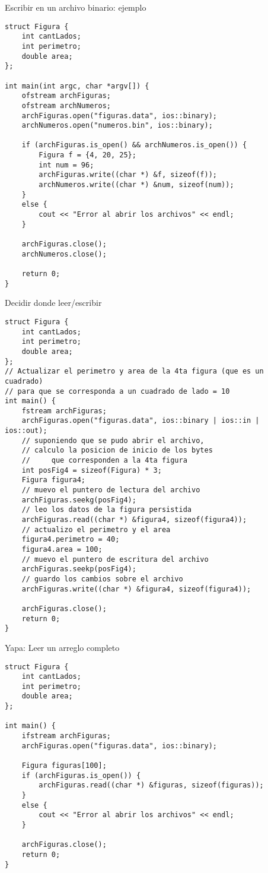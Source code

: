 \documentclass[12pt]{beamer}
\begin{document}
\begin{frame}[fragile]{Escribir en un archivo binario: ejemplo}
\begin{lstlisting}[basicstyle=\tiny]
struct Figura {
	int cantLados;
	int perimetro;
	double area;
};

int main(int argc, char *argv[]) {
	ofstream archFiguras;
	ofstream archNumeros;
	archFiguras.open("figuras.data", ios::binary);
	archNumeros.open("numeros.bin", ios::binary);
	
	if (archFiguras.is_open() && archNumeros.is_open()) {
		Figura f = {4, 20, 25};
		int num = 96;
		archFiguras.write((char *) &f, sizeof(f));
		archNumeros.write((char *) &num, sizeof(num));
	}
	else {
		cout << "Error al abrir los archivos" << endl;
	}
	
	archFiguras.close();
	archNumeros.close();
	
	return 0;
}
\end{lstlisting}
\end{frame}

\begin{frame}[fragile]{Decidir donde leer/escribir}
\begin{lstlisting}[basicstyle=\tiny]
struct Figura {
    int cantLados;
    int perimetro;
    double area;
};
// Actualizar el perimetro y area de la 4ta figura (que es un cuadrado)
// para que se corresponda a un cuadrado de lado = 10
int main() {
    fstream archFiguras;
    archFiguras.open("figuras.data", ios::binary | ios::in | ios::out);
    // suponiendo que se pudo abrir el archivo,
    // calculo la posicion de inicio de los bytes
    //     que corresponden a la 4ta figura
    int posFig4 = sizeof(Figura) * 3;
    Figura figura4;
    // muevo el puntero de lectura del archivo
    archFiguras.seekg(posFig4);
    // leo los datos de la figura persistida
    archFiguras.read((char *) &figura4, sizeof(figura4));
    // actualizo el perimetro y el area
    figura4.perimetro = 40;
    figura4.area = 100;
    // muevo el puntero de escritura del archivo
    archFiguras.seekp(posFig4);
    // guardo los cambios sobre el archivo
    archFiguras.write((char *) &figura4, sizeof(figura4));

    archFiguras.close();
    return 0;
}
\end{lstlisting}
\end{frame}

\begin{frame}[fragile]{Yapa: Leer un arreglo completo}
\begin{lstlisting}[basicstyle=\tiny]
struct Figura {
    int cantLados;
    int perimetro;
    double area;
};

int main() {
    ifstream archFiguras;
    archFiguras.open("figuras.data", ios::binary);
    
    Figura figuras[100];
    if (archFiguras.is_open()) {
        archFiguras.read((char *) &figuras, sizeof(figuras));
	}
	else {
		cout << "Error al abrir los archivos" << endl;
	}

    archFiguras.close();
    return 0;
}
\end{lstlisting}
\end{frame}
\end{document}
